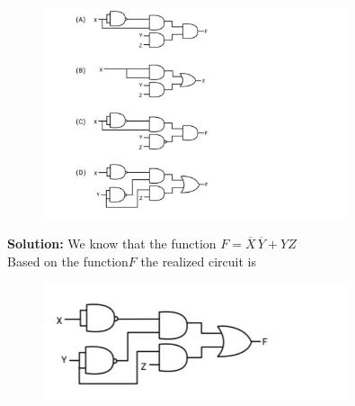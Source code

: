 \documentclass{article}
\begin{document}
\begin{figure}[h!]
    \centering
    \includegraphics[width=0.8\textwidth]{DigitalCircuits.jpg}
\end{figure}
\newpage\textbf{Solution:}
  We know that the function \(F=\overline{X} \, \overline{Y}+YZ\)\\ 
  Based on the function\(F\) the realized circuit is  
\begin{figure}[h!]
    \centering
    \includegraphics[width=0.8\textwidth]{RealizedCircuit.jpg}
\end{figure}
\end{document}
